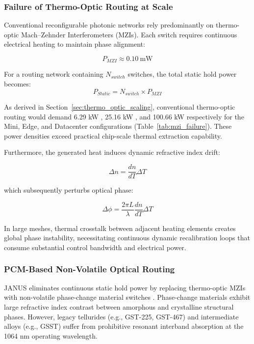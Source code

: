\documentclass[journal]{IEEEtran}
\begin{document}
\subsubsection{\textbf{Failure of Thermo-Optic Routing at Scale}}

Conventional reconfigurable photonic networks rely predominantly on thermo-optic Mach--Zehnder Interferometers (MZIs). Each switch requires continuous electrical heating to maintain phase alignment:

\begin{equation}
P_{MZI} \approx 0.10~\mathrm{mW}
\end{equation}

For a routing network containing $N_{switch}$ switches, the total static hold power becomes:
\begin{equation}
P_{Static} = N_{switch}\times P_{MZI}
\end{equation}

As derived in Section~\ref{sec:thermo_optic_scaling}, conventional thermo-optic routing would demand 6.29 kW , 25.16 kW , and 100.66 kW respectively for the Mini, Edge, and Datacenter configurations (Table~\ref{tab:mzi_failure}). These power densities exceed practical chip-scale thermal extraction capability.

Furthermore, the generated heat induces dynamic refractive index drift:

\begin{equation}
\Delta n = \frac{dn}{dT}  \Delta T 
\end{equation}

which subsequently perturbs optical phase:

\begin{equation}
\Delta\phi = \frac{2\pi L}{\lambda}\frac{dn}{dT}\Delta T
\end{equation}

In large meshes, thermal crosstalk between adjacent heating elements creates global phase instability, necessitating continuous dynamic recalibration loops that consume substantial control bandwidth and electrical power.

\subsubsection{\textbf{PCM-Based Non-Volatile Optical Routing}}

JANUS eliminates continuous static hold power by replacing thermo-optic MZIs with non-volatile phase-change material switches \cite{Xu2019,Zhang2019,Delaney2020,Rios2021}. Phase-change materials exhibit large refractive index contrast between amorphous and crystalline structural phases. However, legacy tellurides (e.g., GST-225, GST-467) and intermediate alloys (e.g., GSST) suffer from prohibitive resonant interband absorption at the 1064 nm operating wavelength. 
\end{document}
